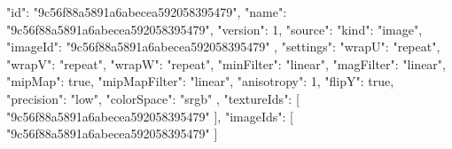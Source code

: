 {
  "id": "9c56f88a5891a6abecea592058395479",
  "name": "9c56f88a5891a6abecea592058395479",
  "version": 1,
  "source": {
    "kind": "image",
    "imageId": "9c56f88a5891a6abecea592058395479"
  },
  "settings": {
    "wrapU": "repeat",
    "wrapV": "repeat",
    "wrapW": "repeat",
    "minFilter": "linear",
    "magFilter": "linear",
    "mipMap": true,
    "mipMapFilter": "linear",
    "anisotropy": 1,
    "flipY": true,
    "precision": "low",
    "colorSpace": "srgb"
  },
  "textureIds": [
    "9c56f88a5891a6abecea592058395479"
  ],
  "imageIds": [
    "9c56f88a5891a6abecea592058395479"
  ]
}

